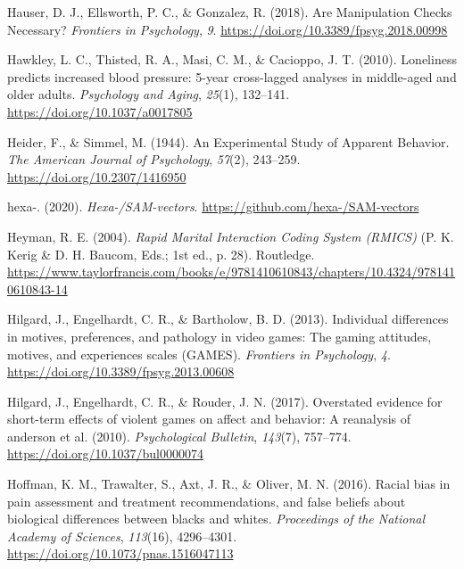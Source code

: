 \documentclass[
]{udthesis}
\newlength{\cslhangindent}
\newenvironment{CSLReferences}[2] %
 {\begin{list}{}{%
  \setlength{\itemindent}{0pt}
  \setlength{\leftmargin}{0pt}
  \setlength{\parsep}{0pt}
  \ifodd #1
   \setlength{\leftmargin}{\cslhangindent}
   \setlength{\itemindent}{-1\cslhangindent}
  \fi
  \setlength{\itemsep}{#2\baselineskip}}}
 {\end{list}}
\begin{document}
\begin{CSLReferences}{1}{0}
Hauser, D. J., Ellsworth, P. C., \& Gonzalez, R. (2018). Are {Manipulation Checks Necessary}? \emph{Frontiers in Psychology}, \emph{9}. \url{https://doi.org/10.3389/fpsyg.2018.00998}

Hawkley, L. C., Thisted, R. A., Masi, C. M., \& Cacioppo, J. T. (2010). Loneliness predicts increased blood pressure: 5-year cross-lagged analyses in middle-aged and older adults. \emph{Psychology and Aging}, \emph{25}(1), 132--141. \url{https://doi.org/10.1037/a0017805}

Heider, F., \& Simmel, M. (1944). An {Experimental Study} of {Apparent Behavior}. \emph{The American Journal of Psychology}, \emph{57}(2), 243--259. \url{https://doi.org/10.2307/1416950}

hexa-. (2020). \emph{Hexa-/SAM-vectors}. \url{https://github.com/hexa-/SAM-vectors}

Heyman, R. E. (2004). \emph{Rapid Marital Interaction Coding System (RMICS)} (P. K. Kerig \& D. H. Baucom, Eds.; 1st ed., p. 28). Routledge. \url{https://www.taylorfrancis.com/books/e/9781410610843/chapters/10.4324/9781410610843-14}

Hilgard, J., Engelhardt, C. R., \& Bartholow, B. D. (2013). Individual differences in motives, preferences, and pathology in video games: The gaming attitudes, motives, and experiences scales ({GAMES}). \emph{Frontiers in Psychology}, \emph{4}. \url{https://doi.org/10.3389/fpsyg.2013.00608}

Hilgard, J., Engelhardt, C. R., \& Rouder, J. N. (2017). Overstated evidence for short-term effects of violent games on affect and behavior: A reanalysis of anderson et al. (2010). \emph{Psychological Bulletin}, \emph{143}(7), 757--774. \url{https://doi.org/10.1037/bul0000074}

Hoffman, K. M., Trawalter, S., Axt, J. R., \& Oliver, M. N. (2016). Racial bias in pain assessment and treatment recommendations, and false beliefs about biological differences between blacks and whites. \emph{Proceedings of the National Academy of Sciences}, \emph{113}(16), 4296--4301. \url{https://doi.org/10.1073/pnas.1516047113}


\end{CSLReferences}
\end{document}

